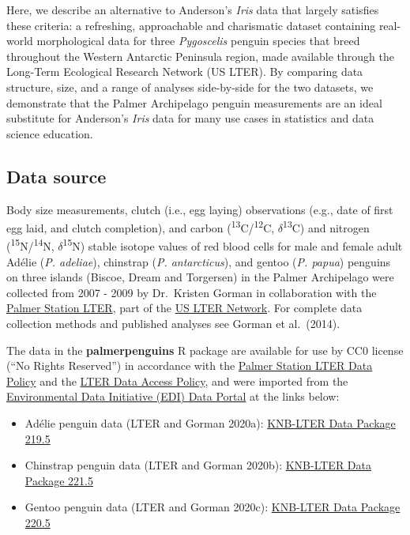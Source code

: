 Here, we describe an alternative to Anderson's \emph{Iris} data that
largely satisfies these criteria: a refreshing, approachable and
charismatic dataset containing real-world morphological data for three
\emph{Pygoscelis} penguin species that breed throughout the Western
Antarctic Peninsula region, made available through the Long-Term
Ecological Research Network (US LTER). By comparing data structure,
size, and a range of analyses side-by-side for the two datasets, we
demonstrate that the Palmer Archipelago penguin measurements are an
ideal substitute for Anderson's \emph{Iris} data for many use cases in
statistics and data science education.

\hypertarget{data-source}{%
\subsection{Data source}\label{data-source}}

Body size measurements, clutch (i.e., egg laying) observations (e.g.,
date of first egg laid, and clutch completion), and carbon
(\textsuperscript{13}C/\textsuperscript{12}C,
\(\delta\)\textsuperscript{13}C) and nitrogen
(\textsuperscript{15}N/\textsuperscript{14}N,
\(\delta\)\textsuperscript{15}N) stable isotope values of red blood
cells for male and female adult Adélie (\emph{P. adeliae}), chinstrap
(\emph{P. antarcticus}), and gentoo (\emph{P. papua}) penguins on three
islands (Biscoe, Dream and Torgersen) in the Palmer Archipelago were
collected from 2007 - 2009 by Dr.~Kristen Gorman in collaboration with
the \href{https://pal.lternet.edu/}{Palmer Station LTER}, part of the
\href{https://lternet.edu/}{US LTER Network}. For complete data
collection methods and published analyses see Gorman et al.~(2014).

The data in the \textbf{palmerpenguins} R package are available for use
by CC0 license (``No Rights Reserved'') in accordance with the
\href{https://pal.lternet.edu/data/policies}{Palmer Station LTER Data
Policy} and the \href{https://lternet.edu/data-access-policy/}{LTER Data
Access Policy}, and were imported from the
\href{https://environmentaldatainitiative.org/}{Environmental Data
Initiative (EDI) Data Portal} at the links below:

\begin{itemize}
\tightlist
\item
  Adélie penguin data (LTER and Gorman 2020a):
  \href{https://portal.edirepository.org/nis/mapbrowse?packageid=knb-lter-pal.219.5}{KNB-LTER
  Data Package 219.5}
\item
  Chinstrap penguin data (LTER and Gorman 2020b):
  \href{https://portal.edirepository.org/nis/mapbrowse?packageid=knb-lter-pal.221.6}{KNB-LTER
  Data Package 221.5}
\item
  Gentoo penguin data (LTER and Gorman 2020c):
  \href{https://portal.edirepository.org/nis/mapbrowse?packageid=knb-lter-pal.220.5}{KNB-LTER
  Data Package 220.5}
\end{itemize}

